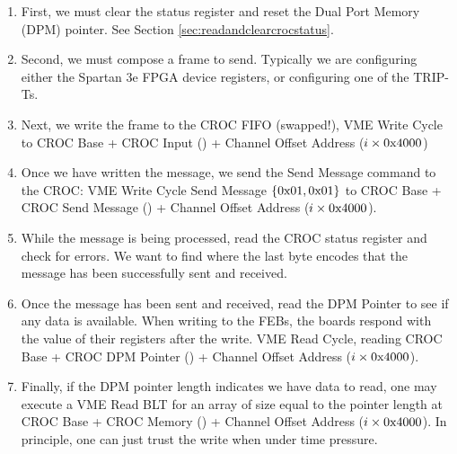 \begin{enumerate}
\item First, we must clear the status register and reset the Dual Port Memory (DPM) pointer. See Section \ref{sec:readandclearcrocstatus}.
\item Second, we must compose a frame to send. Typically we are configuring either the Spartan 3e FPGA device registers, or configuring one of the TRIP-Ts.
\item Next, we write the frame to the CROC FIFO (swapped!), VME Write Cycle to CROC Base + CROC Input () + Channel Offset Address ($i \times \text{0x4000}$)
\item Once we have written the message, we send the Send Message command to the CROC: VME Write Cycle Send Message $\left\{\text{0x01},\text{0x01}\right\}$ to CROC Base + CROC Send Message () + Channel Offset Address ($i \times \text{0x4000}$).
\item While the message is being processed, read the CROC status register and check for errors. We want to find  where the last byte encodes that the message has been successfully sent and received.
\item Once the message has been sent and received, read the DPM Pointer to see if any data is available. When writing to the FEBs, the boards respond with the value of their registers after the write. VME Read Cycle, reading CROC Base + CROC DPM Pointer () + Channel Offset Address ($i \times \text{0x4000}$). 
\item Finally, if the DPM pointer length indicates we have data to read, one may execute a VME Read BLT for an array of size equal to the pointer length at CROC Base + CROC Memory () + Channel Offset Address ($i \times \text{0x4000}$). In principle, one can just trust the write when under time pressure.
\end{enumerate}






